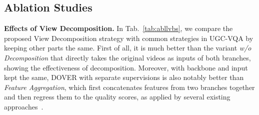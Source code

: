 \documentclass[10pt,twocolumn,letterpaper]{article}
\renewcommand{\paragraph}[1]{\noindent \textbf{#1}}
\newcommand{\nonecolor}[1]{}
\newcommand{\bred}[1]{\textbf{\textcolor{red}{#1}}}
\begin{document}
\begin{comment}
\multicolumn{10}{l}{\textit{Group 2: Variants for Regularization Strategies:}}\\\hdashline
\textit{w/o} Multi-scale Learning & 0.884/0.885 & 0.787/0.823 & 0.876/0.875 & 0.830/0.851 & 0.766/0.781 &  0.855/0.853 & 0.743/0.787 & 0.842/0.851 & 0.781/0.814 & 0.736/0.753 \\ \hline
\nonecolor{lightgray} \textbf{\textit{Accu. for technical branch only}} (for reference) &  0.877/0.878 & 0.778/0.812 & 0.861/0.855 & 0.825/0.844 & 0.730/0.746 & NA & NA & NA & NA & NA \\ 
\textbf{DOVER (Ours)} & \bred{0.888}/\bred{0.889} & \bred{0.795}/\bred{0.830} & \bred{0.884}/\bred{0.883} & \bred{0.832}/\bred{0.855} & \bred{0.772}/\bred{0.788} &  0.855/0.856 & 0.738/0.782 & 0.843/0.852 & 0.792/0.826 & 0.744/0.763 \\ 
\hline
\end{tabular}}
\vspace{-10pt}
\end{table*}

\end{comment}










\subsection{Ablation Studies}
\label{sec:abl}

\paragraph{Effects of View Decomposition.} In Tab.~\ref{tab:abllvbs}, we compare the proposed View Decomposition strategy with common strategies in UGC-VQA by keeping other parts the same. First of all, it is much better than the variant \textit{w/o Decomposition} that directly takes the original videos as inputs of both branches, showing the effectiveness of decomposition. Moreover, with backbone and input kept the same, DOVER with separate supervisions is also notably better than \textit{Feature Aggregation}, which first concatenates features from two branches together and then regress them to the quality scores, as applied by several existing approaches~\cite{bvqa2021,svqa,pvq}.
\end{document}
